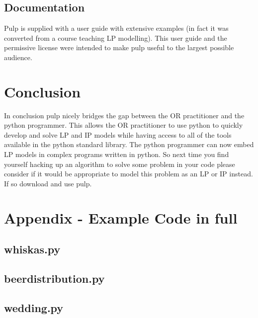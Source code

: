\documentclass[a4paper,oneside]{arlimsTPPM}
\begin{document}
\subsection{Documentation}
Pulp is supplied with a user guide with extensive examples (in fact it was converted from a course teaching LP modelling). This user guide and the permissive license were intended to make pulp useful to the largest possible audience.

\section{Conclusion}
In conclusion pulp nicely bridges the gap between the OR practitioner and the python programmer. This allows the OR practitioner to use python to quickly develop and solve LP and IP models while having access to all of the tools available in the python standard library. The python programmer can now embed LP models in complex programs written in python. So next time you find yourself hacking up an algorithm to solve some problem in your code please consider if it would be appropriate to model this problem as an LP or IP instead. If so download and use pulp.

\section*{Appendix - Example Code in full}
\subsection*{whiskas.py}


\subsection*{beerdistribution.py}


\subsection*{wedding.py}



\newpage


\label{lastpagenum}
\end{document}
